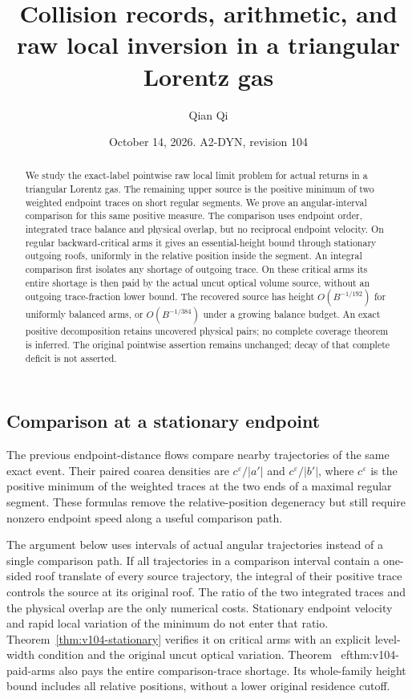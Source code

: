 \documentclass[11pt,reqno]{amsart}
\title[Collision records and raw local inversion]{Collision records, arithmetic, and raw local inversion in a triangular Lorentz gas}
\author{Qian Qi}
\date{October 14, 2026. A2-DYN, revision 104}
\numberwithin{equation}{section}
\theoremstyle{definition}\newtheorem{definition}[theorem]{Definition}
\theoremstyle{remark}\newtheorem{remark}[theorem]{Remark}
\begin{document}
\raggedbottom
\begin{abstract}
We study the exact-label pointwise raw local limit problem for actual
returns in a triangular Lorentz gas. The remaining upper source is
the positive minimum of two weighted endpoint traces on short regular
segments. We prove an angular-interval comparison for this same
positive measure. The comparison uses endpoint order, integrated
trace balance and physical overlap, but no reciprocal endpoint
velocity. On regular backward-critical arms it gives an essential-height
bound through stationary outgoing roofs, uniformly in the relative
position inside the segment. An integral comparison first isolates
any shortage of outgoing trace. On these critical arms its entire
shortage is then paid by the actual uncut optical volume source,
without an outgoing trace-fraction lower bound. The recovered source has height $O(B^{-1/192})$
for uniformly balanced arms, or $O(B^{-1/384})$ under a growing balance
budget. An exact positive decomposition retains uncovered physical pairs;
no complete coverage theorem is inferred. The original pointwise assertion remains
unchanged; decay of that complete deficit is not asserted.
\end{abstract}
\maketitle


\subsection{Comparison at a stationary endpoint}
The previous endpoint-distance flows compare nearby trajectories of
the same exact event. Their paired coarea densities are
$c^\varepsilon/|a'|$ and $c^\varepsilon/|b'|$, where
$c^\varepsilon$ is the positive minimum of the weighted traces at
the two ends of a maximal regular segment. These formulas remove
the relative-position degeneracy but still require nonzero endpoint
speed along a useful comparison path.

The argument below uses intervals of actual angular trajectories
instead of a single comparison path. If all trajectories in a
comparison interval contain a one-sided roof translate of every
source trajectory, the integral of their positive trace controls the
source at its original roof. The ratio of the two integrated traces
and the physical overlap are the only numerical costs. Stationary
endpoint velocity and rapid local variation of the minimum do not
enter that ratio. Theorem~\ref{thm:v104-stationary} verifies it on
critical arms with an explicit level-width condition and the original uncut optical variation. Theorem~
ef{thm:v104-paid-arms}
also pays the entire comparison-trace shortage. Its whole-family
height bound includes all
relative positions, without a lower original residence cutoff.
\end{document}
